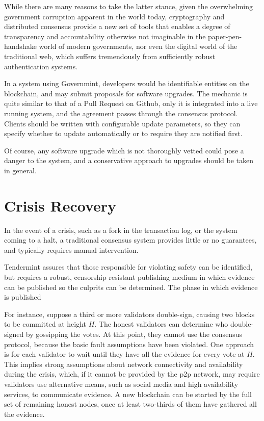 While there are many reasons to take the latter stance, 
given the overwhelming government corruption apparent in the world today,
cryptography and distributed consensus provide a new set of tools that enables a degree
of transparency and accountability otherwise not imaginable in the paper-pen-handshake world of modern governments,
nor even the digital world of the traditional web, which suffers tremendously from sufficiently robust authentication systems.

In a system using Governmint, developers would be identifiable entities on the blockchain,
and may submit proposals for software upgrades. 
The mechanic is quite similar to that of a Pull Request on Github, 
only it is integrated into a live running system,
and the agreement passes through the consensus protocol.
Clients should be written with configurable update parameters, 
so they can specify whether to update automatically or to require they are notified first.

Of course, any software upgrade which is not thoroughly vetted could pose a danger to the system,
and a conservative approach to upgrades should be taken in general.

\section{Crisis Recovery}

In the event of a crisis, such as a fork in the transaction log,
or the system coming to a halt, 
a traditional consensus system provides little or no guarantees,
and typically requires manual intervention.

Tendermint assures that those responsible for violating safety can be identified,
but requires a robust, censorship resistant publishing medium in which evidence can be published 
so the culprits can be determined. 
The phase in which evidence is published 

For instance, suppose a third or more validators double-sign, 
causing two blocks to be committed at height $H$.
The honest validators can determine who double-signed by gossipping the votes.
At this point, they cannot use the consensus protocol, because the basic fault assumptions have been violated.
One approach is for each validator to wait until they have all the evidence for every vote at $H$.
This implies strong assumptions about network connectivity and availability during the crisis,
which, if it cannot be provided by the p2p network, may require validators use alternative means, 
such as social media and high availability services, to communicate evidence.
A new blockchain can be started by the full set of remaining honest nodes, 
once at least two-thirds of them have gathered all the evidence.

